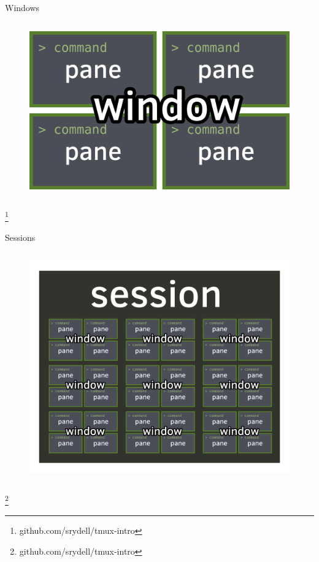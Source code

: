 \documentclass[10pt]{beamer}
\newcommand\blfootnote[1]{%
  \begingroup
  \renewcommand\thefootnote{}\footnote{#1}%
  \addtocounter{footnote}{-1}%
  \endgroup
}
\begin{document}
\begin{frame}{Windows}
    \begin{columns}[c]
        \column{4in}
            \begin{figure}[h!]
                \centering
                \includegraphics[width=1\textwidth]{../figures/window.png}
            \end{figure}
    \end{columns}
    \blfootnote{github.com/srydell/tmux-intro}
\end{frame}

\begin{frame}{Sessions}
    \begin{columns}[c]
        \column{4in}
            \begin{figure}[h!]
                \centering
                \includegraphics[width=1\textwidth]{../figures/session.png}
            \end{figure}
    \end{columns}
    \blfootnote{github.com/srydell/tmux-intro}
\end{frame}
\end{document}
